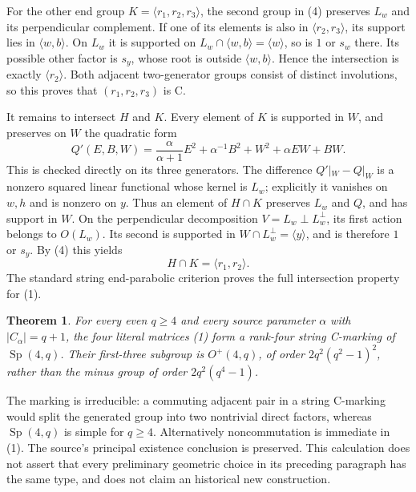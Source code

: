 \documentclass[11pt,a4paper]{article}
\newtheorem{theorem}{Theorem}
\newcommand{\gen}[1]{\langle#1\rangle}
\begin{document}
For the other end group $K=\gen{r_1,r_2,r_3}$, the second group
in (4) preserves $L_w$ and its perpendicular complement. If one
of its elements is also in $\gen{r_2,r_3}$, its support lies in
$\gen{w,b}$. On $L_w$ it is supported on
$L_w\cap\gen{w,b}=\gen w$, so is $1$ or $s_w$ there.
Its possible other factor is $s_y$, whose root is outside
$\gen{w,b}$. Hence the intersection is exactly $\gen{r_2}$.
Both adjacent two-generator groups consist of distinct involutions,
so this proves that $(r_1,r_2,r_3)$ is C.

It remains to intersect $H$ and $K$. Every element of $K$ is
supported in $W$, and preserves on $W$ the quadratic form
\[
 Q'(E,B,W)=\frac{\alpha}{\alpha+1}E^2+
                 \alpha^{-1}B^2+W^2+\alpha EW+BW.            \tag{7}
\]
This is checked directly on its three generators. The difference
$Q'|_W-Q|_W$ is a nonzero squared linear functional whose kernel
is $L_w$; explicitly it vanishes on $w,h$ and is nonzero on $y$.
Thus an element of $H\cap K$ preserves $L_w$ and $Q$, and has
support in $W$. On the perpendicular decomposition
$V=L_w\perp L_w^\perp$, its first action belongs to $O(L_w)$.
Its second is supported in $W\cap L_w^\perp=\gen y$, and is
therefore $1$ or $s_y$. By (4) this yields
\[
                  H\cap K=\gen{r_1,r_2}.                  \tag{8}
\]
The standard string end-parabolic criterion proves the full
intersection property for (1).

\begin{theorem}
For every even $q\geq4$ and every source parameter $\alpha$
with $|C_\alpha|=q+1$, the four literal matrices (1) form a
rank-four string C-marking of $\operatorname{Sp}(4,q)$.
Their first-three subgroup is $O^+(4,q)$, of order
$2q^2(q^2-1)^2$, rather than the minus group of order
$2q^2(q^4-1)$.
\end{theorem}
The marking is irreducible: a commuting adjacent pair in a string
C-marking would split the generated group into two nontrivial
direct factors, whereas $\operatorname{Sp}(4,q)$ is simple for
$q\geq4$. Alternatively noncommutation is immediate in (1).
The source's principal existence conclusion is preserved. This
calculation does not assert that every preliminary geometric choice
in its preceding paragraph has the same type, and does not claim
an historical new construction.
\end{document}
